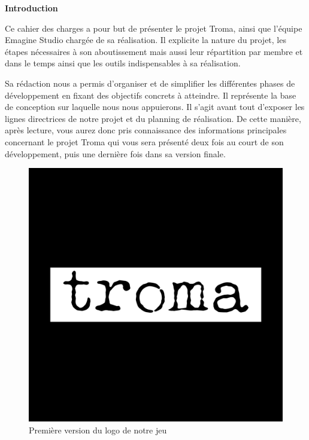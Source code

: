 \documentclass[a4paper, 11pt]{report}
\begin{document}
\tableofcontents

\newpage
\textbf{{\huge Introduction}} \vspace{7mm}

Ce cahier des charges a pour but de présenter  le projet Troma, ainsi que l’équipe Emagine Studio chargée de sa réalisation.
Il explicite la nature du projet, les étapes nécessaires à son aboutissement mais aussi leur répartition par membre et dans le temps ainsi que les outils indispensables à sa réalisation.

Sa rédaction nous a permis d’organiser et de simplifier les différentes phases de développement en fixant des objectifs concrets à atteindre. Il représente la base de conception sur laquelle nous nous appuierons.
Il s’agit avant tout d’exposer les lignes directrices de notre projet et du planning de réalisation. De cette manière, après lecture, vous aurez donc pris connaissance des informations principales concernant le projet Troma qui vous sera présenté deux fois au court de son développement, puis une dernière fois dans sa version finale. \vspace{7mm}

\begin{figure}[htbp]
\centering
\includegraphics[scale=0.12]{troma.png}
\caption{Première version du logo de notre jeu}
\end{figure}
\end{document}
